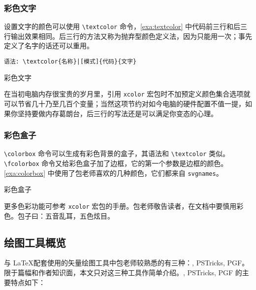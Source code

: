\subsubsection{彩色文字}

设置文字的颜色可以使用 \verb|\textcolor| 命令，\autoref{exa:textcolor} 中代码前三行和后三行输出效果相同。后三行的方法又称为抛弃型颜色定义法，因为只能用一次；事先定义了名字的话还可以重用。

\verb+语法: \textcolor{名称}|[模式]{代码}{文字}+

\begin{example}[h]
\caption{彩色文字}
\label{exa:textcolor}
\end{example}

在当初电脑内存很宝贵的岁月里，引用 \texttt{xcolor} 宏包时不加预定义颜色集合选项就可以节省几十乃至几百个变量；当然这项节约对如今电脑的硬件配置不值一提，如果你坚持要做内存葛朗台，后三行的写法还是可以满足你变态的心理。

\subsubsection{彩色盒子}

\verb|\colorbox| 命令可以生成有彩色背景的盒子，其语法和 \verb|\textcolor| 类似。\verb|\fcolorbox| 命令又给彩色盒子加了边框，它的第一个参数是边框的颜色。\autoref{exa:colorbox} 中使用了包老师喜欢的几种颜色，它们都来自 \texttt{svgnames}。

\begin{example}[h]
\begin{BTDemo}[numbers=left]
\colorbox{Lavender}{}
\colorbox{SkyBlue}{}
\colorbox{Wheat}{}
\end{BTDemo}
\caption{彩色盒子}
\label{exa:colorbox}
\end{example}

更多色彩功能可参考 \texttt{xcolor} 宏包的手册\citep{Kern_xcolor}。包老师敬告读者，在文档中要慎用彩色。包子曰：五音乱耳，五色炫目。

\subsection{绘图工具概览}
\label{sec:graph_tools}

与 \LaTeX 配套使用的矢量绘图工具中包老师较熟悉的有三种：\MP, PSTricks, PGF。限于篇幅和作者知识面，本文只对这三种工具作简单介绍。\MP, PSTricks, PGF 的主要特点如下：

